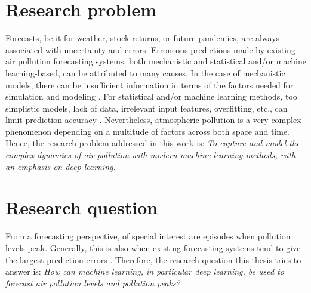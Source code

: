 
\section{Research problem}

Forecasts, be it for weather, stock returns, or future pandemics, are always associated with uncertainty and errors. Erroneous predictions made by existing air pollution forecasting systems, both mechanistic and statistical and/or machine learning-based, can be attributed to many causes. 
In the case of mechanistic models, there can be insufficient information in terms of the factors needed for simulation and modeling \cite{atmos7020015}. For statistical and/or machine learning methods, too simplistic models, lack of data, irrelevant input features, overfitting, etc., can limit prediction accuracy \cite{atmos7020015}. Nevertheless, atmospheric pollution is a very complex phenomenon depending on a multitude of factors across both space and time. Hence, the research problem addressed in this work is:
\textit{To capture and model the complex dynamics of air pollution with modern machine learning methods, with an emphasis on deep learning.}




\section{Research question}
From a forecasting perspective, of special interest are episodes when pollution levels peak. Generally, this is also when existing forecasting systems tend to give the largest prediction errors \cite{atmos7020015}. Therefore, the research question this thesis tries to answer is:
\textit{How can machine learning, in particular deep learning, be used to forecast air pollution levels and pollution peaks?}

